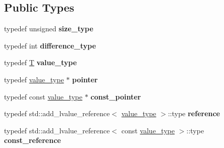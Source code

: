 \subsection*{Public Types}
\begin{DoxyCompactItemize}
\item 
\mbox{\label{classnon__default__test__allocator_a5cbc61ef5de2c16c689f57c3f1e45a6b}} 
typedef unsigned {\bfseries size\+\_\+type}
\item 
\mbox{\label{classnon__default__test__allocator_a5ecc7b3b449505ef03687d814c05c7f2}} 
typedef int {\bfseries difference\+\_\+type}
\item 
\mbox{\label{classnon__default__test__allocator_a04db8db545c0085b4336e0a60ae41fc4}} 
typedef \mbox{\hyperlink{struct_t}{T}} {\bfseries value\+\_\+type}
\item 
\mbox{\label{classnon__default__test__allocator_ae11bfa00c1b6fdc042035647f8b1598f}} 
typedef \mbox{\hyperlink{struct_t}{value\+\_\+type}} $\ast$ {\bfseries pointer}
\item 
\mbox{\label{classnon__default__test__allocator_aa7959c50bea9d33bf0011830aca65dee}} 
typedef const \mbox{\hyperlink{struct_t}{value\+\_\+type}} $\ast$ {\bfseries const\+\_\+pointer}
\item 
\mbox{\label{classnon__default__test__allocator_a749d5ec1180e88b5d70c764c3a4df0be}} 
typedef std\+::add\+\_\+lvalue\+\_\+reference$<$ \mbox{\hyperlink{struct_t}{value\+\_\+type}} $>$\+::type {\bfseries reference}
\item 
\mbox{\label{classnon__default__test__allocator_a590adbe99490119f74692ff3d23a7f94}} 
typedef std\+::add\+\_\+lvalue\+\_\+reference$<$ const \mbox{\hyperlink{struct_t}{value\+\_\+type}} $>$\+::type {\bfseries const\+\_\+reference}
\end{DoxyCompactItemize}
